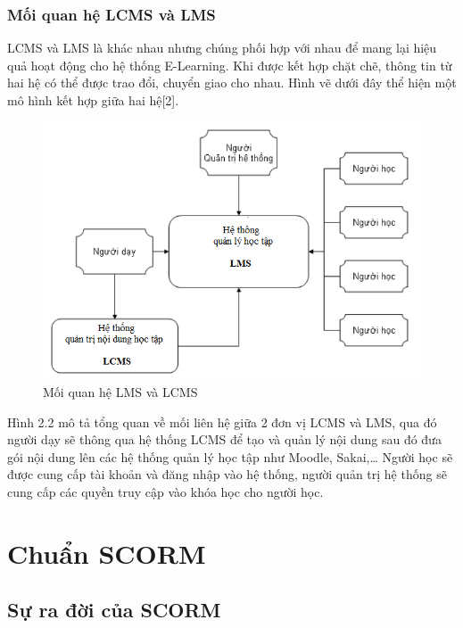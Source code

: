 \subsubsection{Mối quan hệ LCMS và LMS}

	LCMS và LMS là khác nhau nhưng chúng phối hợp với nhau để mang lại hiệu quả hoạt động cho hệ thống E-Learning. Khi được kết hợp chặt chẽ, thông tin từ hai hệ có thể được trao đổi, chuyển giao cho nhau. Hình vẽ dưới đây thể hiện một mô hình kết hợp giữa hai hệ[2].


\begin{center}
	\begin{figure}[htp]
		\begin{center}
			\includegraphics[width=15cm]{Chapter2/Pictures/picture22.png}
		\end{center}
		\caption{Mối quan hệ LMS và LCMS}
		\label{refpicture22}
	\end{figure}
\end{center}

	Hình 2.2 mô tả tổng quan về mối liên hệ giữa 2 đơn vị LCMS và LMS, qua đó người dạy sẽ thông qua hệ thống LCMS để tạo và quản lý nội dung sau đó đưa gói nội dung lên các hệ thống quản lý học tập như Moodle, Sakai,… Người học sẽ được cung cấp tài khoản và đăng nhập vào hệ thống, người quản trị hệ thống sẽ cung cấp các quyền truy cập vào khóa học cho người học.
	
\newpage

\section{Chuẩn SCORM}
	\subsection{Sự ra đời của SCORM}
	
